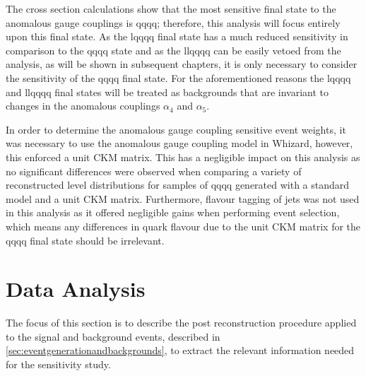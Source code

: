 The cross section calculations show that the most sensitive final state to the anomalous gauge couplings is \nu{\nu}qqqq; therefore, this analysis will focus entirely upon this final state.  As the l{\nu}qqqq final state has a much reduced sensitivity in comparison to the \nu{\nu}qqqq state and as the llqqqq can be easily vetoed from the analysis, as will be shown in subsequent chapters, it is only necessary to consider the sensitivity of the \nu{\nu}qqqq final state.  For the aforementioned reasons the l{\nu}qqqq and llqqqq final states will be treated as backgrounds that are invariant to changes in the anomalous couplings $\alpha_{4}$ and $\alpha_{5}$.  

In order to determine the anomalous gauge coupling sensitive event weights, it was necessary to use the anomalous gauge coupling model in Whizard, however, this enforced a unit CKM matrix.  This has a negligible impact on this analysis as no significant differences were observed when comparing a variety of reconstructed level distributions for samples of \nu{\nu}qqqq generated with a standard model and a unit CKM matrix.  Furthermore, flavour tagging of jets was not used in this analysis as it offered negligible gains when performing event selection, which means any differences in quark flavour due to the unit CKM matrix for the \nu{\nu}qqqq final state should be irrelevant.


\section{Data Analysis}
\label{sec:dataanalysis}
The focus of this section is to describe the post reconstruction procedure applied to the signal and background events, described in \ref{sec:eventgenerationandbackgrounds}, to extract the relevant information needed for the sensitivity study. 


